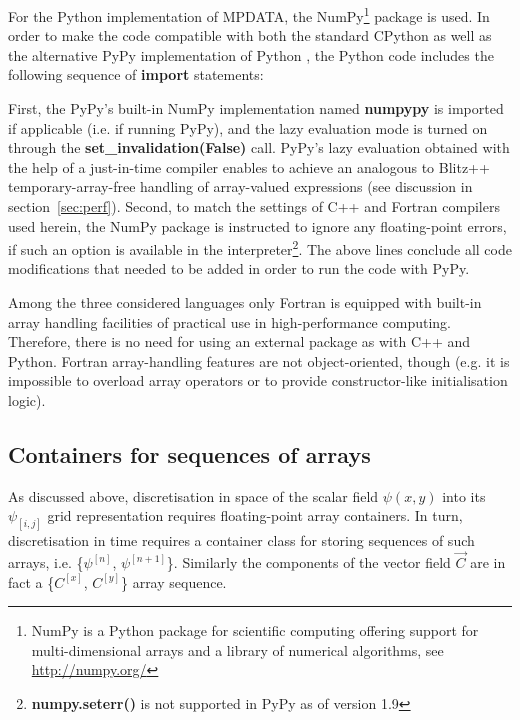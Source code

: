 \documentclass[twocolumn]{article}
\newcommand{\changed}[1]{#1}
\newcounter{lstnopyt}
\newcounter{linenopyt}
\newcommand*\FancyVerbStartString{}
\newcommand*\FancyVerbStopString{}
\newcommand{\codepyt}[4]{%
  \addtocounter{lstnopyt}{1}%
  \renewcommand*\FancyVerbStartString{\PY{c}{\PYZsh{}#2}}
  \renewcommand*\FancyVerbStopString{\PY{c}{\PYZsh{}#3}}
  \setcounter{FancyVerbLine}{\thelinenopyt}%
  \fvset{label={listing~P.\thelstnopyt~(Python)},rulecolor=\color{blue},stepnumber=#4}%
  \setcounter{linenopyt}{\value{FancyVerbLine}}%
}
\newcommand{\prog}[1]{{\rm\bf#1}}
\begin{document}
  For the Python implementation of MPDATA, the NumPy\footnote{NumPy is a Python package
    for scientific computing offering support for multi-dimensional arrays and a library
    of numerical algorithms, see \url{http://numpy.org/}} package is used.
  In order to make the code compatible with both the standard CPython
    as well as the alternative PyPy implementation of Python \citep[][]{Bolz_et_al_2011},
    the Python code includes the following sequence of \prog{import} statements: 
  \codepyt{code-pyt-listings.py}{listing02}{listing03}{1}
  First, the PyPy's built-in NumPy implementation named \prog{numpypy} is imported if applicable (i.e. if running PyPy), 
    and the lazy evaluation mode is turned on through the \prog{set\_invalidation(False)} call.
  PyPy's lazy evaluation obtained with the help of a just-in-time compiler enables to achieve
    an analogous to Blitz++ temporary-array-free handling of array-valued expressions 
    (see discussion in section~\ref{sec:perf}).
  Second, to match the settings of C++ and Fortran compilers used herein, the NumPy package is instructed 
    to ignore any floating-point errors, if such an option
    is available in the interpreter\footnote{\prog{numpy.seterr()} is not supported in PyPy as of version 1.9}.
  The above lines conclude all code modifications that needed to be added in order to run
    the code with PyPy.

  Among the three considered languages only Fortran is equipped with built-in
    array handling facilities of practical use in high-performance computing. 
  Therefore, there is no need for using an external package as with C++ and Python.  
  Fortran array-handling features are not object-oriented, though \changed{(e.g. it is impossible
    to overload array operators or to provide constructor-like initialisation logic)}. 

  \subsection{Containers for sequences of arrays}\label{sec:sequence}

  As discussed above, discretisation in space of the scalar field $\psi(x,y)$ into its $\psi_{[i,j]}$ 
    grid representation requires floating-point array containers.
  In turn, discretisation in time requires a container class for storing
    sequences of such arrays, i.e. \{$\psi^{[n]}$, $\psi^{[n+1]}$\}.
  Similarly the components of the vector field $\vec{C}$ are in fact a \{$C^{[x]}$, $C^{[y]}$\} 
    array sequence.
 
\end{document}
